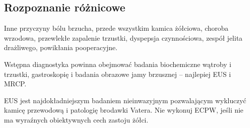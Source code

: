 \subsection{Rozpoznanie różnicowe}

Inne przyczyny bólu brzucha, przede wszystkim kamica żółciowa, choroba wrzodowa, przewlekłe zapalenie trzustki, dyspepsja czynnościowa, zespół jelita drażliwego, powikłania pooperacyjne.

Wstępna diagnostyka powinna obejmować badania biochemiczne wątroby i trzustki, gastroskopię i badania obrazowe jamy brzusznej – najlepiej EUS i MRCP. 

EUS jest najdokładniejszym badaniem nieinwazyjnym pozwalającym wykluczyć kamicę przewodową i patologię brodawki Vatera. 
Nie wykonuj ECPW, jeśli nie ma wyraźnych obiektywnych cech zastoju żółci.
